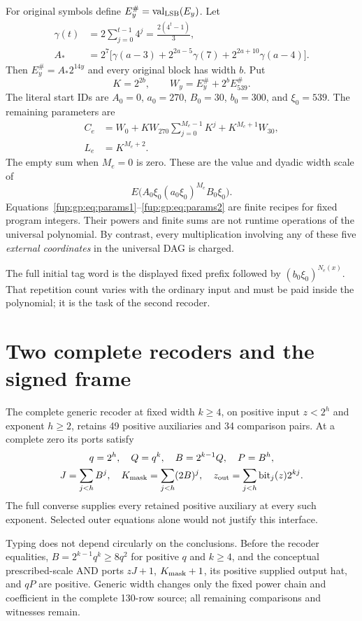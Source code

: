 \documentclass[11pt,letterpaper]{article}
\theoremstyle{definition}\newtheorem{definition}[theorem]{Definition}
\theoremstyle{remark}\newtheorem{remark}[theorem]{Remark}
\newcommand{\val}{\operatorname{val}_{\rm LSB}}
\begin{document}
For original symbols define $E_y^\#=\val(E_y)$. Let
\begin{align*}
 \gamma(t)&=2\sum_{j=0}^{t-1}4^j=\frac{2(4^t-1)}3,\\
 A_*&=2^7\bigl[\gamma(a-3)+2^{2a-5}\gamma(7)
                    +2^{2a+10}\gamma(a-4)\bigr].
\end{align*}
Then $E_y^\#=A_*2^{14y}$ and every original block has width $b$. Put
\[
 K=2^{2b},\qquad W_y=E_y^\#+2^bE_{539}^\#.
\]
The literal start IDs are $A_0=0$, $a_0=270$, $B_0=30$, $b_0=300$, and $\xi_0=539$. The remaining parameters are
\begin{align}
 C_e&=W_0+K W_{270}\sum_{j=0}^{M_e-1}K^j+K^{M_e+1}W_{30},\label{fup:gp:eq:params2}\\
 L_e&=K^{M_e+2}.\nonumber
\end{align}
The empty sum when $M_e=0$ is zero. These are the value and dyadic width scale of
\[
 E\bigl(A_0\xi_0(a_0\xi_0)^{M_e}B_0\xi_0\bigr).
\]
Equations~\eqref{fup:gp:eq:params1}--\eqref{fup:gp:eq:params2} are finite recipes for fixed program integers. Their powers and finite sums are not runtime operations of the universal polynomial. By contrast, every multiplication involving any of these five \emph{external coordinates} in the universal DAG is charged.

The full initial tag word is the displayed fixed prefix followed by $(b_0\xi_0)^{N_e(x)}$. That repetition count varies with the ordinary input and must be paid inside the polynomial; it is the task of the second recoder.

\section{Two complete recoders and the signed frame}\label{fup:gp:sec:recoders}
The complete generic recoder at fixed width $k\ge4$, on positive input $z<2^h$ and exponent $h\ge2$, retains 49 positive auxiliaries and 34 comparison pairs. At a complete zero its ports satisfy
\begin{gather}
 q=2^h,\quad Q=q^k,\quad B=2^{k-1}Q,\quad P=B^h,\label{fup:gp:eq:recoder}\\
 J=\sum_{j<h}B^j,\quad K_{\rm mask}=\sum_{j<h}(2B)^j,\quad
 z_{\rm out}=\sum_{j<h}\operatorname{bit}_j(z)2^{kj}.\nonumber
\end{gather}
The full converse supplies every retained positive auxiliary at every such exponent. Selected outer equations alone would not justify this interface.

Typing does not depend circularly on the conclusions. Before the recoder equalities, $B=2^{k-1}q^k\ge8q^2$ for positive $q$ and $k\ge4$, and the conceptual prescribed-scale AND ports $zJ+1$, $K_{\rm mask}+1$, its positive supplied output hat, and $qP$ are positive. Generic width changes only the fixed power chain and coefficient in the complete 130-row source; all remaining comparisons and witnesses remain.
\end{document}

